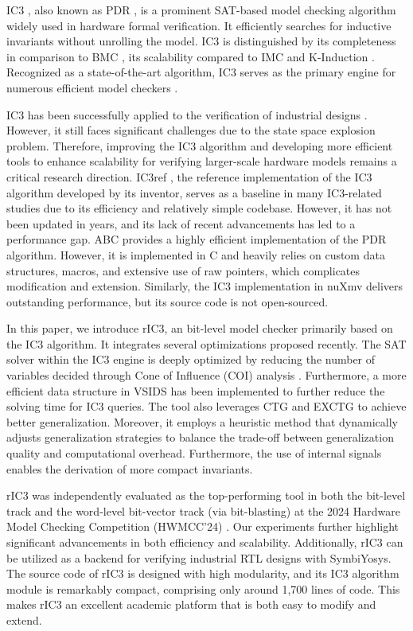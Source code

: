 \documentclass[runningheads]{llncs}
\begin{document}
IC3 \cite{IC3}, also known as PDR \cite{PDR}, is a prominent SAT-based model checking algorithm widely used in hardware formal verification. It efficiently searches for inductive invariants without unrolling the model. IC3 is distinguished by its completeness in comparison to BMC \cite{BMC}, its scalability compared to IMC \cite{IMC} and K-Induction \cite{KINDUCTION}. Recognized as a state-of-the-art algorithm, IC3 serves as the primary engine for numerous efficient model checkers \cite{ABC,NUXMV,AVR,PONO}.

IC3 has been successfully applied to the verification of industrial designs \cite{IC3IndustrialDesign}. However, it still faces significant challenges due to the state space explosion problem. Therefore, improving the IC3 algorithm and developing more efficient tools to enhance scalability for verifying larger-scale hardware models remains a critical research direction. IC3ref \cite{IC3ref}, the reference implementation of the IC3 algorithm developed by its inventor, serves as a baseline in many IC3-related studies \cite{DeepIC3,Progress,PredictingLemma,IGoodLemma} due to its efficiency and relatively simple codebase. However, it has not been updated in years, and its lack of recent advancements has led to a performance gap. ABC \cite{ABC} provides a highly efficient implementation of the PDR algorithm. However, it is implemented in C and heavily relies on custom data structures, macros, and extensive use of raw pointers, which complicates modification and extension. Similarly, the IC3 implementation in nuXmv \cite{NUXMV} delivers outstanding performance, but its source code is not open-sourced.

In this paper, we introduce rIC3, an bit-level model checker primarily based on the IC3 algorithm. It integrates several optimizations proposed recently. The SAT solver within the IC3 engine is deeply optimized by reducing the number of variables decided through Cone of Influence (COI) analysis \cite{GipSAT}. Furthermore, a more efficient data structure in VSIDS has been implemented to further reduce the solving time for IC3 queries. The tool also leverages CTG \cite{CTG} and EXCTG \cite{DynAMic} to achieve better generalization. Moreover, it employs a heuristic method that dynamically adjusts generalization strategies \cite{DynAMic} to balance the trade-off between generalization quality and computational overhead. Furthermore, the use of internal signals \cite{IC3INN} enables the derivation of more compact invariants.

rIC3 was independently evaluated as the top-performing tool in both the bit-level track and the word-level bit-vector track (via bit-blasting) at the 2024 Hardware Model Checking Competition (HWMCC’24) \cite{HWMCC}. Our experiments further highlight significant advancements in both efficiency and scalability. Additionally, rIC3 can be utilized as a backend for verifying industrial RTL designs with SymbiYosys. The source code of rIC3 is designed with high modularity, and its IC3 algorithm module is remarkably compact, comprising only around 1,700 lines of code. This makes rIC3 an excellent academic platform that is both easy to modify and extend.
\end{document}
